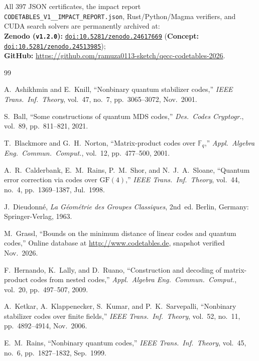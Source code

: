 \documentclass[11pt,a4paper]{article}
\theoremstyle{remark}
\begin{document}
All $397$ JSON certificates, the impact report \texttt{CODETABLES\_\allowbreak V1\_\_\allowbreak IMPACT\_\allowbreak REPORT.json}, Rust/\allowbreak Python/\allowbreak Magma verifiers, and CUDA search solvers are permanently archived at:\\[2pt]
\hspace*{0.6em}\textbf{Zenodo (\texttt{v1.2.0}):} \href{https://doi.org/10.5281/zenodo.24617669}{\texttt{doi:10.5281/zenodo.24617669}} (\textbf{Concept:} \href{https://doi.org/10.5281/zenodo.24513985}{\texttt{doi:10.5281/zenodo.24513985}});\\[1pt]
\hspace*{0.6em}\textbf{GitHub:} \url{https://github.com/ramuza0113-sketch/qecc-codetables-2026}.

\begin{thebibliography}{99}\raggedright

A.~Ashikhmin and E.~Knill,
``Nonbinary quantum stabilizer codes,''
\emph{IEEE Trans.\ Inf.\ Theory}, vol.~47, no.~7, pp.~3065--3072, Nov.\ 2001.

S.~Ball,
``Some constructions of quantum MDS codes,''
\emph{Des.\ Codes Cryptogr.}, vol.~89, pp.~811--821, 2021.

T.~Blackmore and G.~H.~Norton,
``Matrix-product codes over $\mathbb{F}_q$,''
\emph{Appl.\ Algebra Eng.\ Commun.\ Comput.}, vol.~12, pp.~477--500, 2001.

A.~R.~Calderbank, E.~M.~Rains, P.~M.~Shor, and N.~J.~A.~Sloane,
``Quantum error correction via codes over $\mathrm{GF}(4)$,''
\emph{IEEE Trans.\ Inf.\ Theory}, vol.~44, no.~4, pp.~1369--1387, Jul.\ 1998.

J.~Dieudonn\'e,
\emph{La G\'eom\'etrie des Groupes Classiques}, 2nd~ed.
Berlin, Germany: Springer-Verlag, 1963.

M.~Grassl,
``Bounds on the minimum distance of linear codes and quantum codes,''
Online database at \url{http://www.codetables.de}, snapshot verified Nov.\ 2026.

F.~Hernando, K.~Lally, and D.~Ruano,
``Construction and decoding of matrix-product codes from nested codes,''
\emph{Appl.\ Algebra Eng.\ Commun.\ Comput.}, vol.~20, pp.~497--507, 2009.

A.~Ketkar, A.~Klappenecker, S.~Kumar, and P.~K.~Sarvepalli,
``Nonbinary stabilizer codes over finite fields,''
\emph{IEEE Trans.\ Inf.\ Theory}, vol.~52, no.~11, pp.~4892--4914, Nov.\ 2006.

E.~M.~Rains,
``Nonbinary quantum codes,''
\emph{IEEE Trans.\ Inf.\ Theory}, vol.~45, no.~6, pp.~1827--1832, Sep.\ 1999.

\end{thebibliography}
\end{document}
